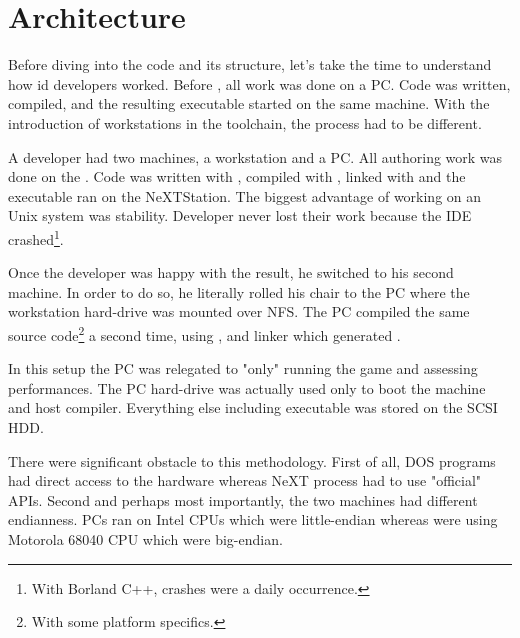 \section{Architecture}
Before diving into the code and its structure, let's take the time to understand how id developers worked. Before \doom, all work was done on a PC. Code was written, compiled, and the resulting executable started on the same machine. With the introduction of \NeXT workstations in the toolchain, the process had to be different.\\
\par
A developer had two machines, a \NeXT workstation and a PC. All authoring work was done on the \NeXT. Code was written with , compiled with , linked with  and the executable ran on the NeXTStation. The biggest advantage of working on an Unix system was stability. Developer never lost their work because the IDE crashed\footnote{With Borland C++, crashes were a daily occurrence.}.\\
\par
Once the developer was happy with the result, he switched to his second machine. In order to do so, he literally rolled his chair to the PC where the \NeXT workstation hard-drive was mounted over NFS. The PC compiled the same source code\footnote{With some platform specifics.} a second time, using , and  linker which generated . \\
\par
 In this setup the PC was relegated to "only" running the game and assessing performances. The PC hard-drive was actually used only to boot the machine and host  compiler. Everything else including  executable was stored on the \NeXT SCSI HDD.\\
\par
There were significant obstacle to this methodology. First of all, DOS programs had direct access to the hardware whereas NeXT process had to use "official" APIs. Second and perhaps most importantly, the two machines had different endianness. PCs ran on Intel CPUs which were little-endian whereas \NeXT were using Motorola 68040 CPU which were big-endian.\\
\vspace{2mm}
\par
\begin{figure}[H]
\centering
{}
\end{figure}
\par



